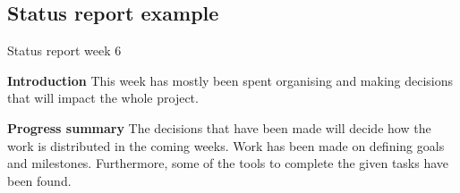 \begin{appendices}

\section{Status report example}
\label{app:status_report}

Status report week 6\newline


		\textbf{Introduction} \newline
		This week has mostly been spent organising and making decisions that will impact the whole project.\newline
		
		\textbf{Progress summary} \newline
		The decisions that have been made will decide how the work is distributed in the coming weeks. Work has been made on defining goals and milestones. Furthermore, some of the tools to complete the given tasks have been found.\newline
		

\end{appendices}
